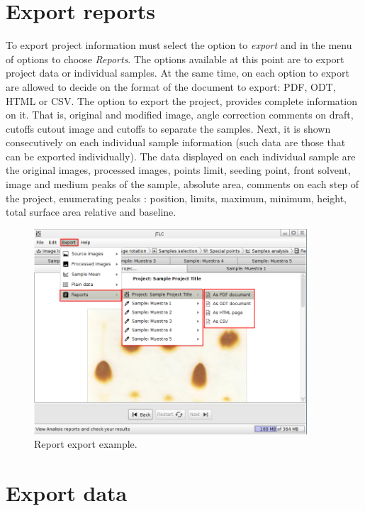 \section{Export reports}
To export project information must select the option to \emph{export} and in the menu of options to choose \emph{Reports}. The options available at this point are to export project data or individual samples. At the same time, on each option to export are allowed to decide on the format of the document to export: PDF, ODT, HTML or CSV.
The option to export the project, provides complete information on it. That is, original and modified image, angle correction comments on draft, cutoffs cutout image and cutoffs to separate the samples. Next, it is shown consecutively on each individual sample information (such data are those that can be exported individually). The data displayed on each individual sample are the original images, processed images, points limit, seeding point, front solvent, image and medium peaks of the sample, absolute area, comments on each step of the project, enumerating peaks : position, limits, maximum, minimum, height, total surface area relative and baseline.
\begin{figure}[H]
	\vspace{0cm}
	\centering
	\includegraphics[width=385px]{imagenes/export_report}
	\centering
	\vspace{-0.4cm}
	\caption{Report export example.}
	\label{fig:export_reports}
	\vspace{-0.25cm}
\end{figure}
\newpage

\section{Export data}
